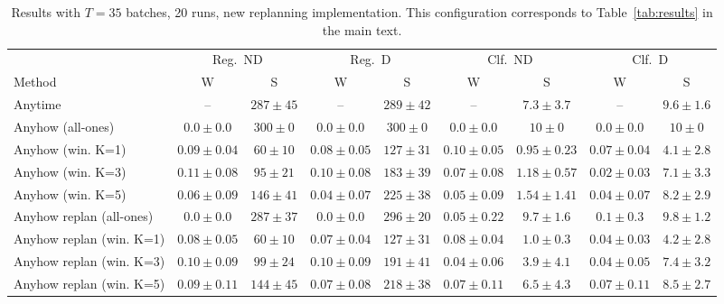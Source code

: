 \documentclass{uai2026} %
\newcommand{\1}{\mathbf{1}}
\begin{document}
\begin{table}[ht]
  \centering
  \caption{Results with $T = 35$ batches, 20 runs, new replanning implementation. This configuration corresponds to Table~\ref{tab:results} in the main text.}
  \label{tab:results-35-20-new}
  \small
  \begin{tabular}{@{}l|cc|cc|cc|cc@{}}
    \toprule
                             & \multicolumn{2}{c|}{Reg.\ ND}
                             & \multicolumn{2}{c|}{Reg.\ D}
                             & \multicolumn{2}{c|}{Clf.\ ND}
                             & \multicolumn{2}{c}{Clf.\ D}                                                                                                                         \\
    \cmidrule(lr){2-3}\cmidrule(lr){4-5}\cmidrule(lr){6-7}\cmidrule(lr){8-9}
    Method                   & W                             & S            & W               & S            & W               & S               & W               & S             \\
    \midrule
    Anytime                  & --                            & $287{\pm}45$ & --              & $289{\pm}42$ & --              & $7.3{\pm}3.7$   & --              & $9.6{\pm}1.6$ \\
    Anyhow (all-ones)        & $0.0{\pm}0.0$                 & $300{\pm}0$  & $0.0{\pm}0.0$   & $300{\pm}0$  & $0.0{\pm}0.0$   & $10{\pm}0$      & $0.0{\pm}0.0$   & $10{\pm}0$    \\
    Anyhow (win. K=1)        & $0.09{\pm}0.04$               & $60{\pm}10$  & $0.08{\pm}0.05$ & $127{\pm}31$ & $0.10{\pm}0.05$ & $0.95{\pm}0.23$ & $0.07{\pm}0.04$ & $4.1{\pm}2.8$ \\
    Anyhow (win. K=3)        & $0.11{\pm}0.08$               & $95{\pm}21$  & $0.10{\pm}0.08$ & $183{\pm}39$ & $0.07{\pm}0.08$ & $1.18{\pm}0.57$ & $0.02{\pm}0.03$ & $7.1{\pm}3.3$ \\
    Anyhow (win. K=5)        & $0.06{\pm}0.09$               & $146{\pm}41$ & $0.04{\pm}0.07$ & $225{\pm}38$ & $0.05{\pm}0.09$ & $1.54{\pm}1.41$ & $0.04{\pm}0.07$ & $8.2{\pm}2.9$ \\
    Anyhow replan (all-ones) & $0.0{\pm}0.0$                 & $287{\pm}37$ & $0.0{\pm}0.0$   & $296{\pm}20$ & $0.05{\pm}0.22$ & $9.7{\pm}1.6$   & $0.1{\pm}0.3$   & $9.8{\pm}1.2$ \\
    Anyhow replan (win. K=1) & $0.08{\pm}0.05$               & $60{\pm}10$  & $0.07{\pm}0.04$ & $127{\pm}31$ & $0.08{\pm}0.04$ & $1.0{\pm}0.3$   & $0.04{\pm}0.03$ & $4.2{\pm}2.8$ \\
    Anyhow replan (win. K=3) & $0.10{\pm}0.09$               & $99{\pm}24$  & $0.10{\pm}0.09$ & $191{\pm}41$ & $0.04{\pm}0.06$ & $3.9{\pm}4.1$   & $0.04{\pm}0.05$ & $7.4{\pm}3.2$ \\
    Anyhow replan (win. K=5) & $0.09{\pm}0.11$               & $144{\pm}45$ & $0.07{\pm}0.08$ & $218{\pm}38$ & $0.07{\pm}0.11$ & $6.5{\pm}4.3$   & $0.07{\pm}0.11$ & $8.5{\pm}2.7$ \\
    \bottomrule
  \end{tabular}
\end{table}
\end{document}
